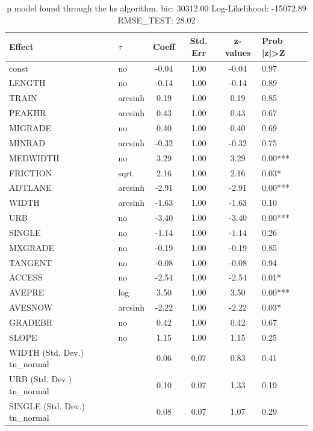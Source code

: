 \begin{table}
	\caption{p model found through the hs algorithm. bic: 30312.00 Log-Likelihood: -15072.89 RMSE_TEST: 28.02}
	\begin{center}
		\begin{tabular}{|l|l|c|c|c|l|}
			\hline
			Effect & $\tau$ & Coeff & Std. Err & z-values & Prob |z|>Z \\
			\hline
			const & no & -0.04 & 1.00 & -0.04 & 0.97 \\
			\hline
			LENGTH & no & -0.14 & 1.00 & -0.14 & 0.89 \\
			\hline
			TRAIN & arcsinh & 0.19 & 1.00 & 0.19 & 0.85 \\
			\hline
			PEAKHR & arcsinh & 0.43 & 1.00 & 0.43 & 0.67 \\
			\hline
			MIGRADE & no & 0.40 & 1.00 & 0.40 & 0.69 \\
			\hline
			MINRAD & arcsinh & -0.32 & 1.00 & -0.32 & 0.75 \\
			\hline
			MEDWIDTH & no & 3.29 & 1.00 & 3.29 & 0.00*** \\
			\hline
			FRICTION & sqrt & 2.16 & 1.00 & 2.16 & 0.03* \\
			\hline
			ADTLANE & arcsinh & -2.91 & 1.00 & -2.91 & 0.00*** \\
			\hline
			WIDTH & arcsinh & -1.63 & 1.00 & -1.63 & 0.10 \\
			\hline
			URB & no & -3.40 & 1.00 & -3.40 & 0.00*** \\
			\hline
			SINGLE & no & -1.14 & 1.00 & -1.14 & 0.26 \\
			\hline
			MXGRADE & no & -0.19 & 1.00 & -0.19 & 0.85 \\
			\hline
			TANGENT & no & -0.08 & 1.00 & -0.08 & 0.94 \\
			\hline
			ACCESS & no & -2.54 & 1.00 & -2.54 & 0.01* \\
			\hline
			AVEPRE & log & 3.50 & 1.00 & 3.50 & 0.00*** \\
			\hline
			AVESNOW & arcsinh & -2.22 & 1.00 & -2.22 & 0.03* \\
			\hline
			GRADEBR & no & 0.42 & 1.00 & 0.42 & 0.67 \\
			\hline
			SLOPE & no & 1.15 & 1.00 & 1.15 & 0.25 \\
			\hline
			WIDTH (Std. Dev.) tn_normal &  & 0.06 & 0.07 & 0.83 & 0.41 \\
			\hline
			URB (Std. Dev.) tn_normal &  & 0.10 & 0.07 & 1.33 & 0.19 \\
			\hline
			SINGLE (Std. Dev.) tn_normal &  & 0.08 & 0.07 & 1.07 & 0.29 \\

\end{tabular}
\end{center}
\end{table}

